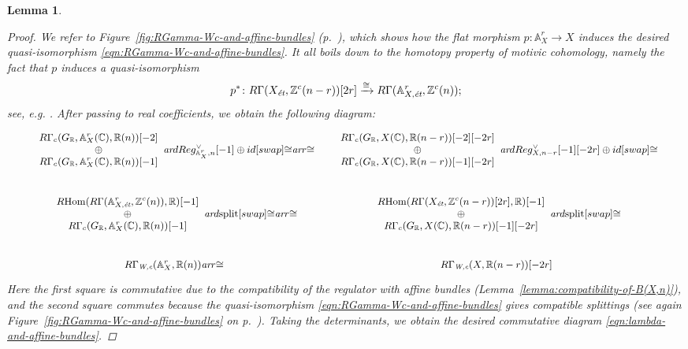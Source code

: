 \documentclass[10pt,a4paper,oneside,draft]{article}
\DeclareMathOperator{\Hom}{Hom}
\newcommand{\CC}{\mathbb{C}}
\newcommand{\RR}{\mathbb{R}}
\newcommand{\ZZ}{\mathbb{Z}}
\renewcommand{\AA}{\mathbb{A}}
\newcommand{\ar}{\text{\it ar}}
\newcommand{\et}{\text{\it \'{e}t}}
\newcommand{\Wc}{\text{\it W,c}}
\newcommand{\RHom}{R\!\Hom}
\theoremstyle{myplain}
\newtheorem{lemma}[theorem]{Lemma}
\theoremstyle{mydefinition}
\numberwithin{equation}{section}
\begin{document}
\begin{lemma}
  \begin{proof}
    We refer to Figure~\ref{fig:RGamma-Wc-and-affine-bundles}
    (p.~\pageref{fig:RGamma-Wc-and-affine-bundles}), which shows how the flat
    morphism $p\colon \AA^r_X \to X$ induces the desired quasi-isomorphism
    \eqref{eqn:RGamma-Wc-and-affine-bundles}. It all boils down to the homotopy
    property of motivic cohomology, namely the fact that $p$ induces a
    quasi-isomorphism
    \[ p^*\colon R\Gamma (X_\et, \ZZ^c (n-r)) [2r] \xrightarrow{\cong}
      R\Gamma (\AA^r_{X,\et}, \ZZ^c (n)); \]
    see, e.g. \cite[Lemma~5.11]{Morin-2014}.
    After passing to real coefficients, we obtain the following diagram:
    \[ \begin{tikzcd}[column sep=1em, font=\small]
        \begin{array}{c} R\Gamma_c (G_\RR, \AA^r_X (\CC), \RR (n)) [-2] \\ \oplus \\ R\Gamma_c (G_\RR, \AA^r_X (\CC), \RR (n)) [-1] \end{array} \ar{d}{Reg_{\AA^r_X,n}^\vee [-1] \oplus id}[swap]{\cong} \ar{r}{\cong} & \begin{array}{c} R\Gamma_c (G_\RR, X (\CC), \RR (n-r)) [-2] [-2r] \\ \oplus \\ R\Gamma_c (G_\RR, X (\CC), \RR (n-r)) [-1] [-2r] \end{array} \ar{d}{Reg_{X,n-r}^\vee [-1] [-2r] \oplus id}[swap]{\cong} \\
        \begin{array}{c} \RHom (R\Gamma (\AA^r_{X,\et}, \ZZ^c (n)), \RR) [-1] \\ \oplus \\ R\Gamma_c (G_\RR, \AA^r_X (\CC), \RR (n)) [-1] \end{array} \ar{d}{\text{split}}[swap]{\cong} \ar{r}{\cong} & \begin{array}{c} \RHom (R\Gamma (X_\et, \ZZ^c (n-r)) [2r], \RR) [-1] \\ \oplus \\ R\Gamma_c (G_\RR, X (\CC), \RR (n-r)) [-1] [-2r] \end{array} \ar{d}{\text{split}}[swap]{\cong} \\
        R\Gamma_\Wc (\AA^r_X, \RR (n)) \ar{r}{\cong} & R\Gamma_\Wc (X, \RR (n-r)) [-2r]
      \end{tikzcd} \]
    Here the first square is commutative due to the compatibility of the
    regulator with affine bundles (Lemma~\ref{lemma:compatibility-of-B(X,n)}),
    and the second square commutes because the quasi-isomorphism
    \eqref{eqn:RGamma-Wc-and-affine-bundles} gives compatible splittings
    (see again Figure~\ref{fig:RGamma-Wc-and-affine-bundles} on
    p.~\pageref{fig:RGamma-Wc-and-affine-bundles}). Taking the determinants, we
    obtain the desired commutative diagram
    \eqref{eqn:lambda-and-affine-bundles}.
  \end{proof}
\end{lemma}
\end{document}
